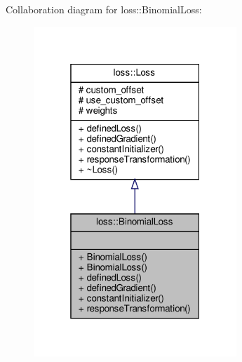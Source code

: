 Collaboration diagram for loss\+:\+:Binomial\+Loss\+:\nopagebreak
\begin{figure}[H]
\begin{center}
\leavevmode
\includegraphics[width=217pt]{classloss_1_1_binomial_loss__coll__graph}
\end{center}
\end{figure}
